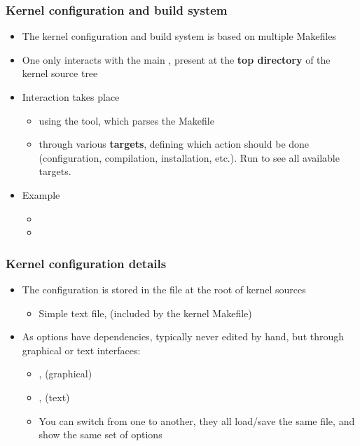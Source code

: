 \begin{frame}
  \frametitle{Kernel configuration and build system}
  \begin{itemize}
  \item The kernel configuration and build system is based on multiple
    Makefiles
  \item One only interacts with the main , present at
    the {\bf top directory} of the kernel source tree
  \item Interaction takes place
    \begin{itemize}
    \item using the  tool, which parses the Makefile
    \item through various {\bf targets}, defining which action should
      be done (configuration, compilation, installation, etc.). Run
       to see all available targets.
    \end{itemize}
  \item Example
    \begin{itemize}
    \item {}
    \item {}
    \end{itemize}
  \end{itemize}
\end{frame}

\begin{frame}
  \frametitle{Kernel configuration details}
  \begin{itemize}
  \item The configuration is stored in the  file at the
    root of kernel sources
    \begin{itemize}
    \item Simple text file,  (included by the kernel Makefile)
    \end{itemize}
  \item As options have dependencies, typically never edited by hand,
    but through graphical or text interfaces:
    \begin{itemize}
    \item {},  (graphical)
    \item {},  (text)
    \item You can switch from one to another, they all load/save the
      same  file, and show the same set of options
    \end{itemize}
  \end{itemize}
\end{frame}

